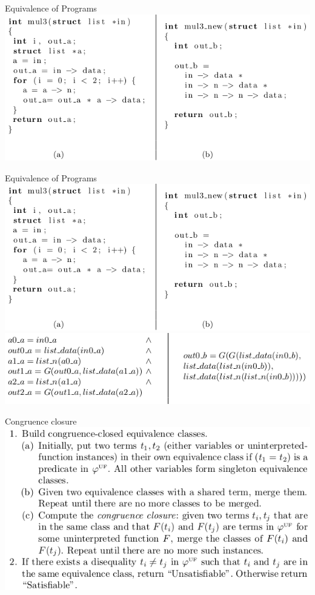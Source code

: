 \documentclass{beamer}
\begin{document}
\begin{frame}{Equivalence of Programs}
\includegraphics[scale=0.5]{mul3.png}
\end{frame}

\begin{frame}{Equivalence of Programs}
\includegraphics[scale=0.5]{mul3.png}
\includegraphics[scale=0.5]{mul3_ans.png}
\end{frame}

\begin{frame}{Congruence closure}
\includegraphics[scale=0.5]{Congruence_closure.png}
\end{frame}
\end{document}
